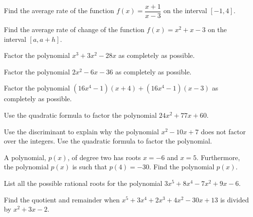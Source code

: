 \documentclass[12pt,letterpaper]{exam}
\begin{document}
\examtitle
{} 
\scores
\newpage

\begin{questions}


\newpage
\question[10] Find the average rate of the function $f(x)= \dfrac{x + 1}{x - 3}$ on the interval $[-1, 4]$. 



\newpage
\question[10] Find the average rate of change of the function $f(x)= x^2 + x - 3$ on the interval $[a, a + h]$. 



\newpage
\question[10] Factor the polynomial $x^3 + 3x^2 - 28x$ as completely as possible. 



\newpage
\question[10] Factor the polynomial $2x^2 - 6x - 36$ as completely as possible. 



\newpage
\question[10] Factor the polynomial $(16x^4 - 1)(x + 4) + (16x^4 - 1)(x - 3)$ as completely as possible. 



\newpage
\question[10] Use the quadratic formula to factor the polynomial $24x^2 + 77x + 60$. 



\newpage
\question[10] Use the discriminant to explain why the polynomial $x^2 - 10x + 7$ does not factor over the integers. Use the quadratic formula to factor the polynomial. 



\newpage
\question[10] A polynomial, $p(x)$, of degree two has roots $x= -6$ and $x= 5$. Furthermore, the polynomial $p(x)$ is such that $p(4)= -30$. Find the polynomial $p(x)$. 



\newpage
\question[10] List all the possible rational roots for the polynomial $3x^5 + 8x^4 - 7x^2 + 9x - 6$. 



\newpage
\question[10] Find the quotient and remainder when $x^5 + 3x^4 + 2x^3 + 4x^2 - 30x + 13$ is divided by $x^2 + 3x - 2$. 




\end{questions}
\end{document}
